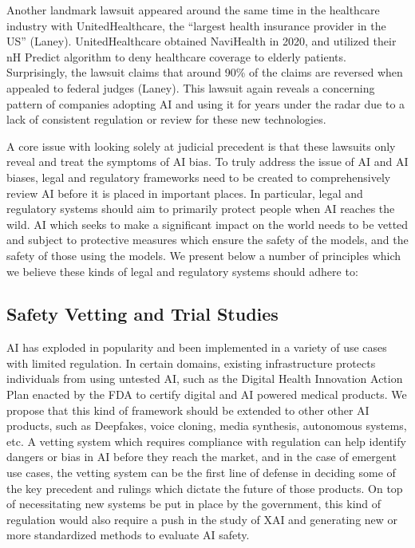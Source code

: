 \documentclass[10pt]{article}
\begin{document}
  Another landmark lawsuit appeared around the same time in the healthcare industry with UnitedHealthcare, the “largest health insurance provider in the US” (Laney). UnitedHealthcare obtained NaviHealth in 2020, and utilized their nH Predict algorithm to deny healthcare coverage to elderly patients. Surprisingly, the lawsuit claims that around 90\% of the claims are reversed when appealed to federal judges (Laney). This lawsuit again reveals a concerning pattern of companies adopting AI and using it for years under the radar due to a lack of consistent regulation or review for these new technologies.

  A core issue with looking solely at judicial precedent is that these lawsuits only reveal and treat the symptoms of AI bias. To truly address the issue of AI and AI biases, legal and regulatory frameworks need to be created to comprehensively review AI before it is placed in important places. In particular, legal and regulatory systems should aim to primarily protect people when AI reaches the wild. AI which seeks to make a significant impact on the world needs to be vetted and subject to protective measures which ensure the safety of the models, and the safety of those using the models. We present below a number of principles which we believe these kinds of legal and regulatory systems should adhere to:

  \subsection{Safety Vetting and Trial Studies}

    AI has exploded in popularity and been implemented in a variety of use cases with limited regulation. In certain domains, existing infrastructure protects individuals from using untested AI, such as the Digital Health Innovation Action Plan enacted by the FDA to certify digital and AI powered medical products. We propose that this kind of framework should be extended to other other AI products, such as Deepfakes, voice cloning, media synthesis, autonomous systems, etc. A vetting system which requires compliance with regulation can help identify dangers or bias in AI before they reach the market, and in the case of emergent use cases, the vetting system can be the first line of defense in deciding some of the key precedent and rulings which dictate the future of those products. On top of necessitating new systems be put in place by the government, this kind of regulation would also require a push in the study of XAI and generating new or more standardized methods to evaluate AI safety.
\end{document}
